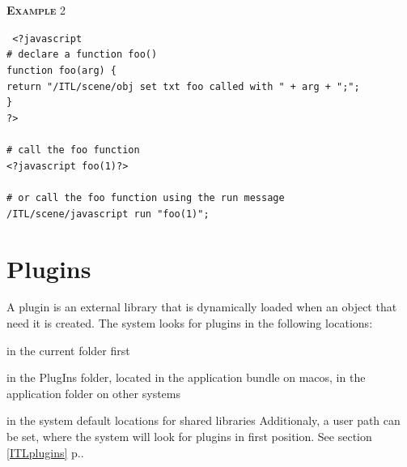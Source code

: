 \documentclass[a4paper,twoside]{report}
\newcommand{\toplevel}[1]	{\chapter{#1}}
\newcommand{\fullref}[1]	{\ref{#1} p.\pageref{#1}}
\newcommand{\OSC}[1]		{\texttt{#1}}
\newcommand{\example}		{\textbf{\hspace{-1.5cm}\textbf{\textsc{Example }}}}
\newcommand{\note}	[1]		{\vspace{2mm}\textbf{\hspace{-0.9cm}\textbf{\textsc{Note #1}}}}
\let\olditemize\itemize
\let\oldenditemize\enditemize
\renewenvironment{itemize} 	{\olditemize \setlength{\itemsep}{1mm}}{\oldenditemize}
\newcommand{\sample}	[1]			{\vspace{-2mm}\begin{center}\colorbox{mygrey}{
								\begin{minipage}[t]{0.9\columnwidth} 
								{\small \texttt{#1}}
								\end{minipage}}\end{center}}
\begin{document}
\example{2}
\sample{
<?javascript \\
\hspace*{3mm} \# declare a function foo() \\
\hspace*{3mm} function foo(arg) \{\\ 
\hspace*{6mm}  return "/ITL/scene/obj set txt foo called with " + arg + ";"; \\
\hspace*{3mm} \} \\
?>\\
\\
\# call the foo function \\
<?javascript foo(1)?>\\
\\
\# or call the foo function using the run message \\
/ITL/scene/javascript run "foo(1)";
}


%




\toplevel{Plugins}
\label{plugins}

A plugin is an external library that is dynamically loaded when an object that need it is created.
The system looks for plugins in the following locations:
\begin{itemize}
\item in the current folder first
\item in the PlugIns folder, located in the application bundle on macos, in the application folder on other systems
\item in the system default locations for shared libraries
\end{itemize}
Additionaly, a user path can be set, where the system will look for plugins in first position. See section \fullref{ITLplugins}.
\end{document}
